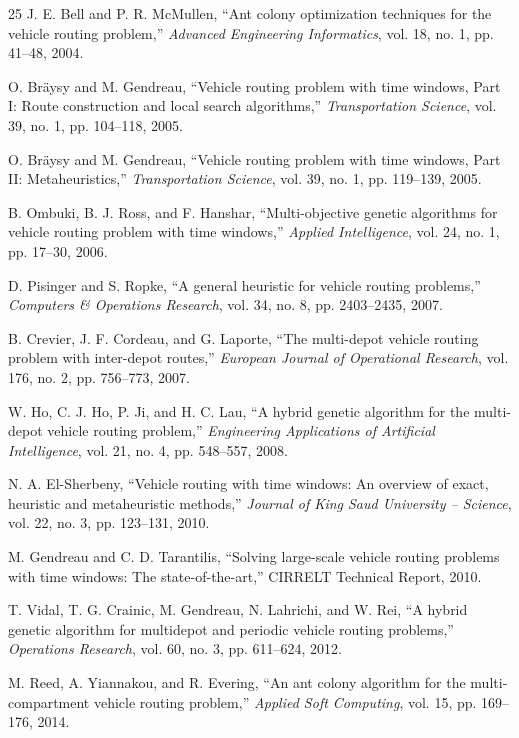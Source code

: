 \documentclass[10pt,conference]{IEEEtran}
\begin{document}
\begin{thebibliography}{25}
 J. E. Bell and P. R. McMullen, ``Ant colony optimization techniques for the vehicle routing problem,'' \textit{Advanced Engineering Informatics}, vol. 18, no. 1, pp. 41--48, 2004.

 O. Br{\"a}ysy and M. Gendreau, ``Vehicle routing problem with time windows, Part I: Route construction and local search algorithms,'' \textit{Transportation Science}, vol. 39, no. 1, pp. 104--118, 2005.

 O. Br{\"a}ysy and M. Gendreau, ``Vehicle routing problem with time windows, Part II: Metaheuristics,'' \textit{Transportation Science}, vol. 39, no. 1, pp. 119--139, 2005.

 B. Ombuki, B. J. Ross, and F. Hanshar, ``Multi-objective genetic algorithms for vehicle routing problem with time windows,'' \textit{Applied Intelligence}, vol. 24, no. 1, pp. 17--30, 2006.

 D. Pisinger and S. Ropke, ``A general heuristic for vehicle routing problems,'' \textit{Computers \& Operations Research}, vol. 34, no. 8, pp. 2403--2435, 2007.

 B. Crevier, J. F. Cordeau, and G. Laporte, ``The multi-depot vehicle routing problem with inter-depot routes,'' \textit{European Journal of Operational Research}, vol. 176, no. 2, pp. 756--773, 2007.

 W. Ho, C. J. Ho, P. Ji, and H. C. Lau, ``A hybrid genetic algorithm for the multi-depot vehicle routing problem,'' \textit{Engineering Applications of Artificial Intelligence}, vol. 21, no. 4, pp. 548--557, 2008.

 N. A. El-Sherbeny, ``Vehicle routing with time windows: An overview of exact, heuristic and metaheuristic methods,'' \textit{Journal of King Saud University -- Science}, vol. 22, no. 3, pp. 123--131, 2010.

 M. Gendreau and C. D. Tarantilis, ``Solving large-scale vehicle routing problems with time windows: The state-of-the-art,'' CIRRELT Technical Report, 2010.

 T. Vidal, T. G. Crainic, M. Gendreau, N. Lahrichi, and W. Rei, ``A hybrid genetic algorithm for multidepot and periodic vehicle routing problems,'' \textit{Operations Research}, vol. 60, no. 3, pp. 611--624, 2012.

 M. Reed, A. Yiannakou, and R. Evering, ``An ant colony algorithm for the multi-compartment vehicle routing problem,'' \textit{Applied Soft Computing}, vol. 15, pp. 169--176, 2014.


\end{thebibliography}
\end{document}
